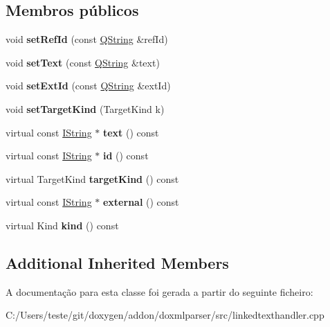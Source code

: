 \subsection*{Membros públicos}
\begin{DoxyCompactItemize}
\item 
\hypertarget{class_l_t___ref_a0c33ab38867b7b410e9b302e4c8577d2}{void {\bfseries set\-Ref\-Id} (const \hyperlink{class_q_string}{Q\-String} \&ref\-Id)}\label{class_l_t___ref_a0c33ab38867b7b410e9b302e4c8577d2}

\item 
\hypertarget{class_l_t___ref_a02afb4d423475b9587fbe642e77bce5d}{void {\bfseries set\-Text} (const \hyperlink{class_q_string}{Q\-String} \&text)}\label{class_l_t___ref_a02afb4d423475b9587fbe642e77bce5d}

\item 
\hypertarget{class_l_t___ref_a2c191dbcd1fd4aeb15a48f6acb865321}{void {\bfseries set\-Ext\-Id} (const \hyperlink{class_q_string}{Q\-String} \&ext\-Id)}\label{class_l_t___ref_a2c191dbcd1fd4aeb15a48f6acb865321}

\item 
\hypertarget{class_l_t___ref_a10fdb101372fdc41f68e44755e12353c}{void {\bfseries set\-Target\-Kind} (Target\-Kind k)}\label{class_l_t___ref_a10fdb101372fdc41f68e44755e12353c}

\item 
\hypertarget{class_l_t___ref_a38ed11cab67ca9bf8d04302e53b86a69}{virtual const \hyperlink{class_i_string}{I\-String} $\ast$ {\bfseries text} () const }\label{class_l_t___ref_a38ed11cab67ca9bf8d04302e53b86a69}

\item 
\hypertarget{class_l_t___ref_acf656d73faffcdf0382f68eb78869cf4}{virtual const \hyperlink{class_i_string}{I\-String} $\ast$ {\bfseries id} () const }\label{class_l_t___ref_acf656d73faffcdf0382f68eb78869cf4}

\item 
\hypertarget{class_l_t___ref_a80540c89e6b5cfa5c1ad130337f08db2}{virtual Target\-Kind {\bfseries target\-Kind} () const }\label{class_l_t___ref_a80540c89e6b5cfa5c1ad130337f08db2}

\item 
\hypertarget{class_l_t___ref_a03ca7bf90446b86c6fd7fff2829a150a}{virtual const \hyperlink{class_i_string}{I\-String} $\ast$ {\bfseries external} () const }\label{class_l_t___ref_a03ca7bf90446b86c6fd7fff2829a150a}

\item 
\hypertarget{class_l_t___ref_af8e62c8a81ddf2283205cc8955de50eb}{virtual Kind {\bfseries kind} () const }\label{class_l_t___ref_af8e62c8a81ddf2283205cc8955de50eb}

\end{DoxyCompactItemize}
\subsection*{Additional Inherited Members}


A documentação para esta classe foi gerada a partir do seguinte ficheiro\-:\begin{DoxyCompactItemize}
\item 
C\-:/\-Users/teste/git/doxygen/addon/doxmlparser/src/linkedtexthandler.\-cpp\end{DoxyCompactItemize}
